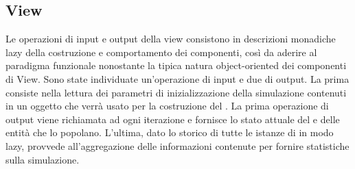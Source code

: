 \subsection{View}

Le operazioni di input e output della view consistono in descrizioni monadiche lazy della costruzione e comportamento dei componenti, così da aderire al paradigma funzionale nonostante la tipica natura object-oriented dei componenti di View. Sono state individuate un'operazione di input e due di output. La prima consiste nella lettura dei parametri di inizializzazione della simulazione contenuti in un oggetto  che verrà usato per la costruzione del . La prima operazione di output viene richiamata ad ogni iterazione e fornisce lo stato attuale del  e delle entità che lo popolano. L'ultima, dato lo storico di tutte le istanze di  in modo lazy, provvede all'aggregazione delle informazioni contenute per fornire statistiche sulla simulazione.


